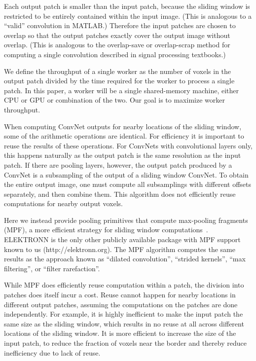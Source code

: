 \documentclass[conference]{./IEEEtran}
\begin{document}
  Each output patch is smaller than the input patch, because the
  sliding window is restricted to be entirely contained within the
  input image.  (This is analogous to a ``valid'' convolution in
  MATLAB.)  Therefore the input patches are chosen to overlap so that
  the output patches exactly cover the output image without
  overlap. (This is analogous to the overlap-save or overlap-scrap
  method for computing a single convolution described in signal
  processing textbooks.)

  We define the throughput of a single worker as the number of voxels
  in the output patch divided by the time required for the worker to
  process a single patch.  In this paper, a worker will be a single
  shared-memory machine, either CPU or GPU or combination of the two.
  Our goal is to maximize worker throughput.

  When computing ConvNet outputs for nearby locations of the sliding
  window, some of the arithmetic operations are identical.  For
  efficiency it is important to reuse the results of these operations.
  For ConvNets with convolutional layers only, this happens naturally
  as the output patch is the same resolution as the input patch.  If
  there are pooling layers, however, the output patch produced by a
  ConvNet is a subsampling of the output of a sliding window ConvNet.
  To obtain the entire output image, one must compute all subsamplings
  with different offsets separately, and then combine them.  This
  algorithm does not efficiently reuse computations for nearby output
  voxels.

  Here we instead provide pooling primitives that compute max-pooling
  fragments (MPF), a more efficient strategy for sliding window
  computations~\cite{giusti2013fast, masci2013fast}.  ELEKTRONN is the
  only other publicly available package with MPF support known to us
  (http://elektronn.org).  The MPF algorithm computes the same
  results as the approach known as ``dilated
  convolution''\cite{yu2015multi}, ``strided
  kernels''\cite{tschopp2015efficient}, ``max
  filtering''\cite{zlateski2015znn}, or ``filter
  rarefaction''\cite{long2015fully}.

  While MPF does efficiently reuse computation within a patch, the
  division into patches does itself incur a cost. Reuse cannot happen
  for nearby locations in different output patches, assuming the
  computations on the patches are done independently.  For example, it
  is highly inefficient to make the input patch the same size as the
  sliding window, which results in no reuse at all across different
  locations of the sliding window.  It is more efficient to increase
  the size of the input patch, to reduce the fraction of voxels near
  the border and thereby reduce inefficiency due to lack of reuse.
\end{document}
